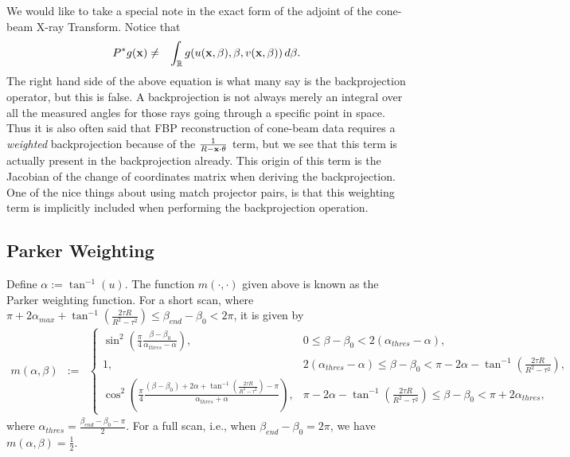 \documentclass[11pt]{article}
\begin{document}
We would like to take a special note in the exact form of the adjoint of the cone-beam X-ray Transform.  Notice that
\begin{eqnarray*}
P^*g(\textbf{x}) &\neq& \int_\mathbb{R} g(u(\textbf{x},\beta), \beta, v(\textbf{x},\beta)) \, d\beta.
\end{eqnarray*}
The right hand side of the above equation is what many say is the backprojection operator, but this is false.  A backprojection is not always merely an integral over all the measured angles for those rays going through a specific point in space.  Thus it is also often said that FBP reconstruction of cone-beam data requires a \textit{weighted} backprojection because of the $\frac{1}{R-\textbf{x}\cdot\theta}$ term, but we see that this term is actually present in the backprojection already.  This origin of this term is the Jacobian of the change of coordinates matrix when deriving the backprojection.  One of the nice things about using match projector pairs, is that this weighting term is implicitly included when performing the backprojection operation.

\subsection{Parker Weighting} \label{sec:ParkerWeighting}

Define $\alpha := \tan^{-1}(u)$.  The function $m(\cdot, \cdot)$ given above is known as the Parker weighting function.  For a short scan, where $\pi + 2\alpha_{max} + \tan^{-1}\left(\frac{2\tau R}{R^2-\tau^2}\right) \leq \beta_{end}-\beta_0 < 2\pi$, it is given by
\begin{eqnarray*}
m(\alpha, \beta) &:=& \begin{cases} \sin^2\left( \frac{\pi}{4} \frac{\beta-\beta_0}{\alpha_{thres} - \alpha} \right), & 0 \leq \beta-\beta_0 < 2(\alpha_{thres}-\alpha), \\ 1, & 2(\alpha_{thres} - \alpha) \leq \beta-\beta_0 < \pi - 2\alpha - \tan^{-1}\left(\frac{2\tau R}{R^2-\tau^2}\right), \\ \cos^2\left( \frac{\pi}{4} \frac{(\beta-\beta_0) + 2\alpha + \tan^{-1}\left(\frac{2\tau R}{R^2-\tau^2}\right) - \pi}{\alpha_{thres}+\alpha} \right), & \pi-2\alpha-\tan^{-1}\left(\frac{2\tau R}{R^2-\tau^2}\right) \leq \beta-\beta_0 < \pi + 2\alpha_{thres}, \end{cases}
\end{eqnarray*}
where $\alpha_{thres} = \frac{\beta_{end}-\beta_0 - \pi}{2}$.  For a full scan, i.e., when $\beta_{end}-\beta_0 = 2\pi$, we have $m(\alpha, \beta) = \frac{1}{2}$.
\end{document}

